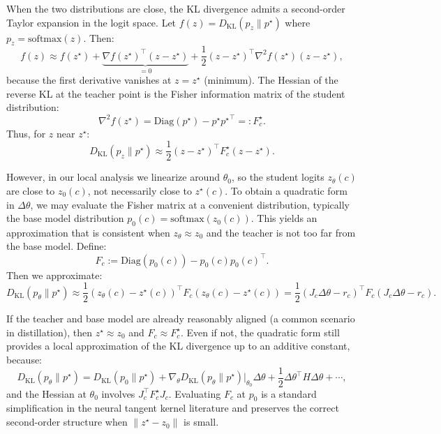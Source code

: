 \documentclass{llmxive}
\begin{document}
When the two distributions are close, the KL divergence admits a second-order Taylor expansion in the logit space. Let \(f(z) = D_{\mathrm{KL}}(p_z\|p^{\star})\) where \(p_z = \mathrm{softmax}(z)\). Then:
\begin{equation}
f(z) \approx f(z^{\star}) + \underbrace{\nabla f(z^{\star})^{\top}(z-z^{\star})}_{=0} + \frac{1}{2}(z-z^{\star})^{\top} \nabla^2 f(z^{\star}) (z-z^{\star}),
\end{equation}
because the first derivative vanishes at \(z=z^{\star}\) (minimum). The Hessian of the reverse KL at the teacher point is the Fisher information matrix of the student distribution:
\begin{equation}
\nabla^2 f(z^{\star}) = \mathrm{Diag}(p^{\star}) - p^{\star}{p^{\star}}^{\top} =: F_c^{\star}.
\end{equation}
Thus, for \(z\) near \(z^{\star}\):
\begin{equation}
D_{\mathrm{KL}}(p_z\|p^{\star}) \approx \frac{1}{2} (z - z^{\star})^{\top} F_c^{\star} (z - z^{\star}).
\end{equation}

However, in our local analysis we linearize around \(\theta_0\), so the student logits \(z_{\theta}(c)\) are close to \(z_0(c)\), not necessarily close to \(z^{\star}(c)\). To obtain a quadratic form in \(\Delta\theta\), we may evaluate the Fisher matrix at a convenient distribution, typically the base model distribution \(p_0(c) = \mathrm{softmax}(z_0(c))\). This yields an approximation that is consistent when \(z_{\theta} \approx z_0\) and the teacher is not too far from the base model. Define:
\begin{equation}
F_c := \mathrm{Diag}(p_0(c)) - p_0(c)p_0(c)^{\top}.
\end{equation}
Then we approximate:
\begin{equation}
D_{\mathrm{KL}}(p_{\theta}\|p^{\star}) \approx \frac{1}{2} (z_{\theta}(c) - z^{\star}(c))^{\top} F_c (z_{\theta}(c) - z^{\star}(c))
= \frac{1}{2} (J_c\Delta\theta - r_c)^{\top} F_c (J_c\Delta\theta - r_c).
\end{equation}

If the teacher and base model are already reasonably aligned (a common scenario in distillation), then \(z^{\star} \approx z_0\) and \(F_c \approx F_c^{\star}\). Even if not, the quadratic form still provides a local approximation of the KL divergence up to an additive constant, because:
\begin{equation}
D_{\mathrm{KL}}(p_{\theta}\|p^{\star}) = D_{\mathrm{KL}}(p_0\|p^{\star}) + \nabla_{\theta}D_{\mathrm{KL}}(p_{\theta}\|p^{\star})|_{\theta_0} \Delta\theta + \frac{1}{2}\Delta\theta^{\top} H \Delta\theta + \cdots,
\end{equation}
and the Hessian at \(\theta_0\) involves \(J_c^{\top} F_c^{\star} J_c\). Evaluating \(F_c\) at \(p_0\) is a standard simplification in the neural tangent kernel literature and preserves the correct second-order structure when \(\|z^{\star}-z_0\|\) is small.
\end{document}
